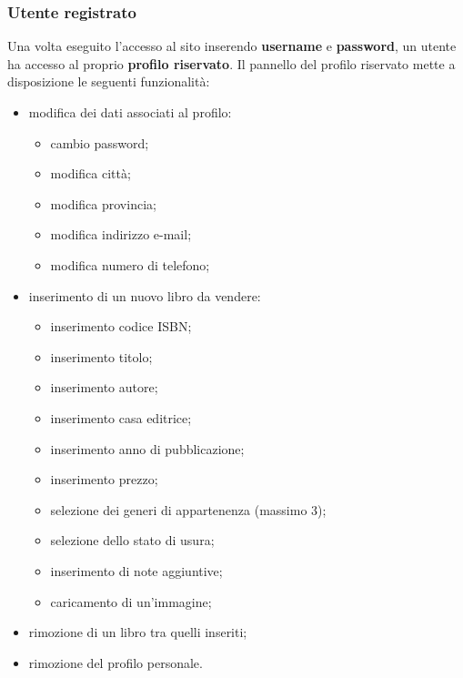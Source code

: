 \documentclass[openany,10pt,a4paper]{article}
\begin{document}
		\subsubsection{Utente registrato}
		Una volta eseguito l'accesso al sito inserendo \textbf{username} e \textbf{password}, un utente ha accesso al proprio \textbf{profilo riservato}. Il pannello del profilo riservato mette a disposizione le 
		seguenti funzionalità:
				\begin{itemize}
					\item modifica dei dati associati al profilo:
						\begin{itemize}
							\item cambio password;
							\item modifica città;
							\item modifica provincia;
							\item modifica indirizzo e-mail;
							\item modifica numero di telefono;
						\end{itemize}
					\item inserimento di un nuovo libro da vendere:
						\begin{itemize}
							\item inserimento codice ISBN;
							\item inserimento titolo;
							\item inserimento autore;
							\item inserimento casa editrice;
							\item inserimento anno di pubblicazione;
							\item inserimento prezzo;
							\item selezione dei generi di appartenenza (massimo 3);
							\item selezione dello stato di usura;
							\item inserimento di note aggiuntive;
							\item caricamento di un'immagine;
						\end{itemize}
					\item rimozione di un libro tra quelli inseriti;
					\item rimozione del profilo personale.
				\end{itemize}
\end{document}
